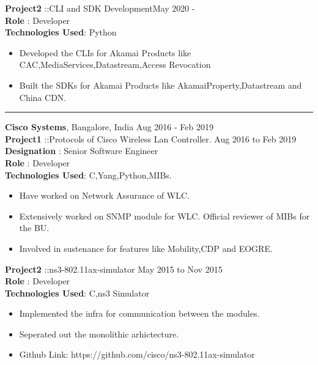 \documentclass{resumeclass}
\begin{document}
\begin{resume}
  \textbf{Project2} ::CLI and SDK Development\hfill      May 2020 - \\
  \textbf{Role} : Developer \\
  \textbf{Technologies Used}: Python
  
   \begin{itemize} \itemsep -2pt
    \item Developed the CLIs for Akamai Products like CAC,MediaServices,Datastream,Access Revocation
    \item Built the SDKs for Akamai Products like AkamaiProperty,Datastream and China CDN.
  \end{itemize} \vspace{-6pt}

\hfill   
\noindent\rule{20cm}{0.4pt}

{\large \textbf{Cisco Systems}, Bangalore, India} \hfill        Aug 2016 - Feb 2019 \\[0.5pt]

\textbf{Project1} ::Protocols of Cisco Wireless Lan Controller. \hfill      Aug 2016 to Feb 2019 \\
\textbf{Designation} : Senior Software Engineer \\
\textbf{Role} : Developer \\
\textbf{Technologies Used}: C,Yang,Python,MIBs.

 \begin{itemize} \itemsep -2pt
  \item Have worked on Network Assurance of WLC.
  \item Extensively worked on SNMP module for WLC. Official reviewer of MIBs for the BU.
  \item Involved in sustenance for features like Mobility,CDP and EOGRE.
\end{itemize} \vspace{-6pt}


\textbf{Project2} ::ns3-802.11ax-simulator \hfill      May 2015 to Nov 2015 \\

\textbf{Role} : Developer \\
\textbf{Technologies Used}: C,ns3 Simulator

 \begin{itemize} \itemsep -2pt
  \item Implemented the infra for communication between the modules.
  \item Seperated out the monolithic arhictecture.
  \item Github Link: https://github.com/cisco/ns3-802.11ax-simulator
\end{itemize} \vspace{-6pt}


\end{resume}
\end{document}

